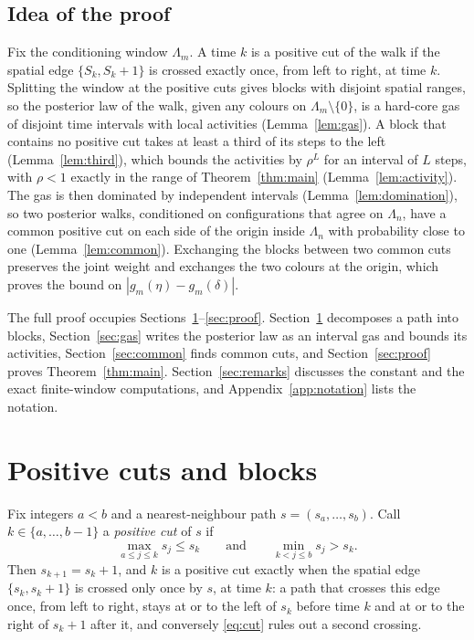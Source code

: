 \documentclass[11pt]{amsart}
\theoremstyle{remark}
\begin{document}
\subsection{Idea of the proof}
Fix the conditioning window $\Lambda_m$. A time $k$ is a positive cut of the walk if the spatial edge
$\{S_k,S_k+1\}$ is crossed exactly once, from left to right, at time $k$. Splitting the window at the positive cuts
gives blocks with disjoint spatial ranges, so the posterior law of the walk, given any colours on
$\Lambda_m\setminus\{0\}$, is a hard-core gas of disjoint time intervals with local activities
(Lemma~\ref{lem:gas}). A block that contains no positive cut takes at least a third of its steps to the left
(Lemma~\ref{lem:third}), which bounds the activities by $\rho^L$ for an interval of $L$ steps, with $\rho<1$ exactly in
the range of Theorem~\ref{thm:main} (Lemma~\ref{lem:activity}). The gas is then dominated by independent intervals
(Lemma~\ref{lem:domination}), so two posterior walks, conditioned on configurations that agree on $\Lambda_n$, have a
common positive cut on each side of the origin inside $\Lambda_n$ with probability close to one
(Lemma~\ref{lem:common}). Exchanging the blocks between two common cuts preserves the joint weight and exchanges the
two colours at the origin, which proves the bound on $|g_m(\eta)-g_m(\delta)|$.

The full proof occupies Sections~\ref{sec:cuts}--\ref{sec:proof}. Section~\ref{sec:cuts} decomposes a path into blocks,
Section~\ref{sec:gas} writes the posterior law as an interval gas and bounds its activities, Section~\ref{sec:common}
finds common cuts, and Section~\ref{sec:proof} proves Theorem~\ref{thm:main}. Section~\ref{sec:remarks} discusses the
constant and the exact finite-window computations, and Appendix~\ref{app:notation} lists the notation.

\section{Positive cuts and blocks}\label{sec:cuts}

Fix integers $a<b$ and a nearest-neighbour path $s=(s_a,\dots,s_b)$. Call $k\in\{a,\dots,b-1\}$ a \emph{positive
cut} of $s$ if
\begin{equation}\label{eq:cut}
\max_{a\le j\le k}s_j\le s_k\qquad\text{and}\qquad\min_{k<j\le b}s_j>s_k .
\end{equation}
Then $s_{k+1}=s_k+1$, and $k$ is a positive cut exactly when the spatial edge $\{s_k,s_k+1\}$ is crossed only once by
$s$, at time $k$: a path that crosses this edge once, from left to right, stays at or to the left of $s_k$ before time
$k$ and at or to the right of $s_k+1$ after it, and conversely \eqref{eq:cut} rules out a second crossing.
\end{document}

